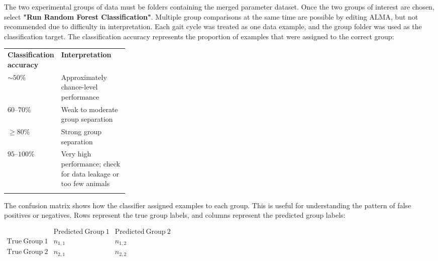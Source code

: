 \documentclass[11pt]{article}
\newif\ifalmaoutputtable
\newcommand{\boxedtoprule}{%
  \ifalmaoutputtable
    \arrayrulecolor{calloutOutputFrame}\hline\rowcolor{calloutOutputHeader}%
  \else
    \arrayrulecolor{almaBlue!62}\hline\rowcolor{almaSky!78}%
  \fi
}
\newcommand{\boxedmidrule}{%
  \ifalmaoutputtable
    \arrayrulecolor{calloutOutputFrame}\hline
  \else
    \arrayrulecolor{calloutDataFrame}\hline
  \fi
}
\newcommand{\boxedbottomrule}{%
  \ifalmaoutputtable
    \arrayrulecolor{calloutOutputFrame}\hline
  \else
    \arrayrulecolor{almaBlue!62}\hline
  \fi
}
\renewcommand{\[}{%
  \par\smallskip\noindent
  \begin{center}%
  \setlength{\fboxsep}{5pt}%
  \setlength{\fboxrule}{0.35pt}%
  \begin{lrbox}{\almaEquationBox}%
  $\displaystyle
}
\renewcommand{\]}{%
  $%
  \end{lrbox}%
  \fcolorbox{equationLine}{equationBack}{\usebox{\almaEquationBox}}%
  \end{center}%
  \smallskip\par
}
\newcommand{\diffdel}[1]{%
  \noindent\colorbox{diffred}{%
    \makebox[\dimexpr\linewidth-2\fboxsep\relax][l]{%
      \textcolor{diffredtext}{\ttfamily - #1}%
    }%
  }%
}
\newcommand{\diffadd}[1]{%
  \noindent\colorbox{diffgreen}{%
    \makebox[\dimexpr\linewidth-2\fboxsep\relax][l]{%
      \textcolor{diffgreentext}{\ttfamily + #1}%
    }%
  }%
}
\begin{document}
\begin{tcolorbox}[
  patch callout,
  left=1mm,
  right=1mm,
  top=1mm,
  bottom=1mm
]
\diffdel{n\_variables = 44}

\vspace{1pt}

\diffadd{n\_variables = 132}
\end{tcolorbox}

\noindent The two experimental groups of data must be folders containing the merged parameter dataset. Once the two groups of interest are chosen, select \textbf{"Run Random Forest Classification"}. Multiple group comparisons at the same time are possible by editing ALMA, but not recommended due to difficulty in interpretation. Each gait cycle was treated as one data example, and the group folder was used as the classification target. The classification accuracy represents the proportion of examples that were assigned to the correct group:

\label{tab:rf_accuracy_interpretation}
\begin{tcolorbox}[compact table box,title=\textbf{Random Forest Accuracy Interpretation}]
\begin{tabularx}{\linewidth}{
>{\centering\arraybackslash}p{0.28\linewidth}|
>{\raggedright\arraybackslash}X
}
\boxedtoprule
\textbf{Classification accuracy} & \textbf{Interpretation} \\
\boxedmidrule

\(\sim 50\%\) & Approximately chance-level performance \\
\(60\text{--}70\%\) & Weak to moderate group separation \\
\(\geq 80\%\) & Strong group separation \\
\(95\text{--}100\%\) & Very high performance; check for data leakage or too few animals \\
\boxedbottomrule
\end{tabularx}
\end{tcolorbox}


The confusion matrix shows how the classifier assigned examples to each
group. This is useful for understanding the pattern of false positives or negatives. Rows represent the true group labels, and columns represent the predicted
group labels:

\begin{tcolorbox}
\centering
\(\displaystyle
\begin{array}{c|cc}
 & \mathrm{Predicted\ Group\ 1} & \mathrm{Predicted\ Group\ 2} \\
\hline
\mathrm{True\ Group\ 1} & n_{1, 1} & n_{1,2} \\
\mathrm{True\ Group\ 2} & n_{2,1} & n_{2,2}
\end{array}
\)
\end{tcolorbox}
\end{document}
